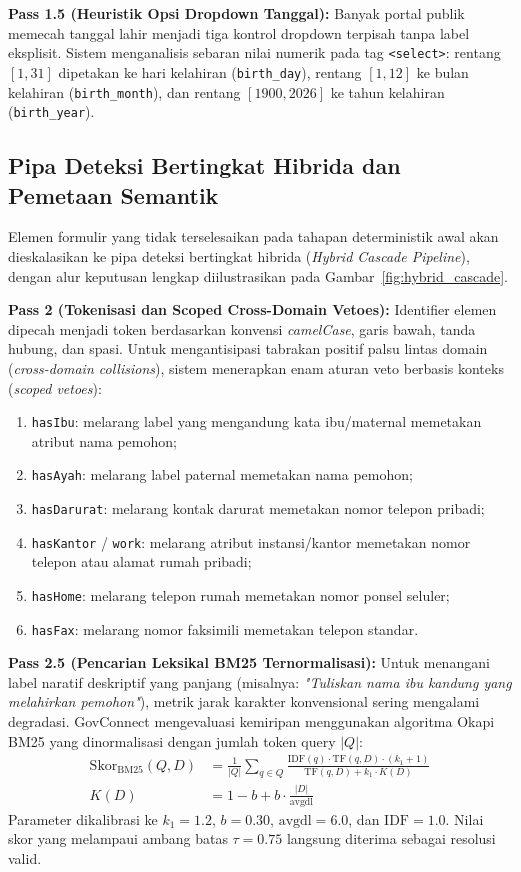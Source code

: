 \documentclass[conference]{IEEEtran}
\begin{document}
\textbf{Pass 1.5 (Heuristik Opsi Dropdown Tanggal):} Banyak portal publik memecah tanggal lahir menjadi tiga kontrol dropdown terpisah tanpa label eksplisit. Sistem menganalisis sebaran nilai numerik pada tag \texttt{<select>}: rentang $[1, 31]$ dipetakan ke hari kelahiran (\texttt{birth\_day}), rentang $[1, 12]$ ke bulan kelahiran (\texttt{birth\_month}), dan rentang $[1900, 2026]$ ke tahun kelahiran (\texttt{birth\_year}).

\subsection{Pipa Deteksi Bertingkat Hibrida dan Pemetaan Semantik}
Elemen formulir yang tidak terselesaikan pada tahapan deterministik awal akan dieskalasikan ke pipa deteksi bertingkat hibrida (\textit{Hybrid Cascade Pipeline}), dengan alur keputusan lengkap diilustrasikan pada Gambar~\ref{fig:hybrid_cascade}.

\textbf{Pass 2 (Tokenisasi dan Scoped Cross-Domain Vetoes):} Identifier elemen dipecah menjadi token berdasarkan konvensi \textit{camelCase}, garis bawah, tanda hubung, dan spasi. Untuk mengantisipasi tabrakan positif palsu lintas domain (\textit{cross-domain collisions}), sistem menerapkan enam aturan veto berbasis konteks (\textit{scoped vetoes}):
\begin{enumerate}[label=(\alph*), leftmargin=*]
    \item \texttt{hasIbu}: melarang label yang mengandung kata ibu/maternal memetakan atribut nama pemohon;
    \item \texttt{hasAyah}: melarang label paternal memetakan nama pemohon;
    \item \texttt{hasDarurat}: melarang kontak darurat memetakan nomor telepon pribadi;
    \item \texttt{hasKantor} / \texttt{work}: melarang atribut instansi/kantor memetakan nomor telepon atau alamat rumah pribadi;
    \item \texttt{hasHome}: melarang telepon rumah memetakan nomor ponsel seluler;
    \item \texttt{hasFax}: melarang nomor faksimili memetakan telepon standar.
\end{enumerate}

\textbf{Pass 2.5 (Pencarian Leksikal BM25 Ternormalisasi):} Untuk menangani label naratif deskriptif yang panjang (misalnya: \textit{"Tuliskan nama ibu kandung yang melahirkan pemohon"}), metrik jarak karakter konvensional sering mengalami degradasi. GovConnect mengevaluasi kemiripan menggunakan algoritma Okapi BM25 \cite{bm25} yang dinormalisasi dengan jumlah token query $|Q|$:
\begin{align}
\text{Skor}_{\text{BM25}}(Q, D) &= \frac{1}{|Q|} \sum_{q \in Q} \frac{\text{IDF}(q) \cdot \text{TF}(q, D) \cdot (k_1 + 1)}{\text{TF}(q, D) + k_1 \cdot K(D)} \label{eq:bm25} \\
K(D) &= 1 - b + b \cdot \frac{|D|}{\text{avgdl}} \nonumber
\end{align}
Parameter dikalibrasi ke $k_1 = 1.2$, $b = 0.30$, $\text{avgdl} = 6.0$, dan $\text{IDF} = 1.0$. Nilai skor yang melampaui ambang batas $\tau = 0.75$ langsung diterima sebagai resolusi valid.
\end{document}
